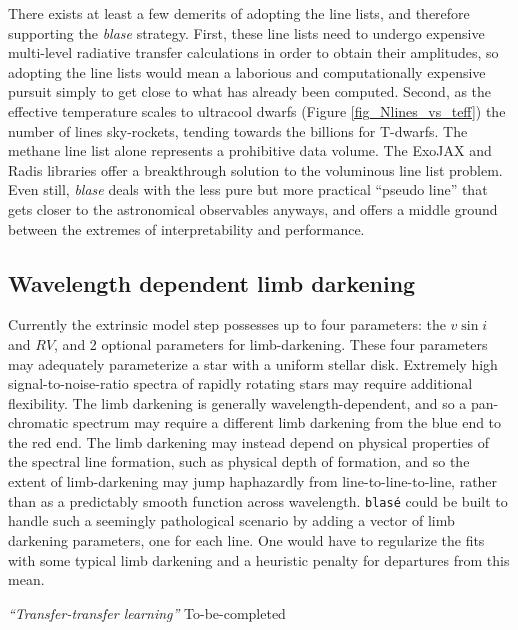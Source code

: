 \documentclass[twocolumn]{aastex631}
\begin{document}
There exists at least a few demerits of adopting the line lists, and therefore supporting the \emph{blase} strategy.  First, these line lists need to undergo expensive multi-level radiative transfer calculations in order to obtain their amplitudes, so adopting the line lists would mean a laborious and computationally expensive pursuit simply to get close to what has already been computed.  Second, as the effective temperature scales to ultracool dwarfs (Figure \ref{fig_Nlines_vs_teff}) the number of lines sky-rockets, tending towards the billions for T-dwarfs.  The methane line list alone  represents a prohibitive data volume.  The ExoJAX and Radis  libraries offer a breakthrough solution to the voluminous line list problem.  Even still, \emph{blase} deals with the less pure but more practical ``pseudo line'' that gets closer to the astronomical observables anyways, and offers a middle ground between the extremes of interpretability and performance.

\subsection{Wavelength dependent limb darkening}
Currently the extrinsic model step possesses up to four parameters: the $v\sin{i}$ and $RV$, and 2 optional parameters for limb-darkening.  These four parameters may adequately parameterize a star with a uniform stellar disk.  Extremely high signal-to-noise-ratio spectra of rapidly rotating stars may require additional flexibility.  The limb darkening is generally wavelength-dependent, and so a pan-chromatic spectrum may require a different limb darkening from the blue end to the red end.  The limb darkening may instead depend on physical properties of the spectral line formation, such as physical depth of formation, and so the extent of limb-darkening may jump haphazardly from line-to-line-to-line, rather than as a predictably smooth function across wavelength.  \texttt{blas\'e} could be built to handle such a seemingly pathological scenario by adding a vector of limb darkening parameters, one for each line.  One would have to regularize the fits with some typical limb darkening and a heuristic penalty for departures from this mean.

\emph{``Transfer-transfer learning''}
To-be-completed
\end{document}
